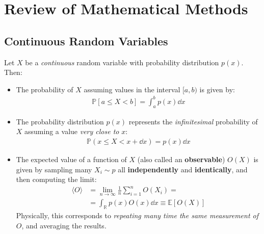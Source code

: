 \documentclass[../template.tex]{subfiles}
\begin{document}
\section{Review of Mathematical Methods}
\subsection{Continuous Random Variables}
Let $X$ be a \textit{continuous} random variable with probability distribution $p(x)$. Then:
\begin{itemize}
    \item The probability of $X$ assuming values in the interval $[a,b)$ is given by:
    \begin{align*}
        \mathbb{P}[a \leq X < b] = \int_a^b p(x) \dd{x}
    \end{align*}
    \item The probability distribution $p(x)$ represents the \textit{infinitesimal} probability of $X$ assuming a value \textit{very close to} $x$:
    \begin{align*}
        \mathbb{P}(x \leq X < x+ \dd{x}) = p(x) \dd{x}
    \end{align*} 
    \item The expected value of a function of $X$ (also called an \textbf{observable}) $O(X)$ is given by sampling many $X_i \sim p$ all \textbf{independently} and \textbf{identically}, and then computing the limit:
    \begin{align*}
        \langle O \rangle &= \lim_{n \to \infty} \frac{1}{n} \sum_{i=1}^n O(X_i) =\\
        &= \int_{\mathbb{R}} p(x) O(x) \dd{x} \equiv \mathbb{E}[O(X)]
    \end{align*}  
    Physically, this corresponds to \textit{repeating many time the same measurement of $O$}, and averaging the results.
\end{itemize}
\end{document}
